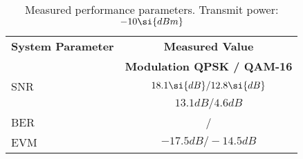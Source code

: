 \begin{table}[htbp]
  \centering
  \caption{Measured performance parameters. Transmit power: $\measPWR \si{dBm}$}
    \begin{tabular}{lc}
    \rowcolor[rgb]{ 0,  0,  0} \textcolor[rgb]{ 1,  1,  1}{\textbf{System Parameter}}	& \textcolor[rgb]{ 1,  1,  1}{\textbf{Measured Value}} 		\\
    \rowcolor[rgb]{ 0,  0,  0} \textcolor[rgb]{ 1,  1,  1}{} & \textcolor[rgb]{ 1,  1,  1}{\textbf{Modulation QPSK / QAM-16}}					\\
    	SNR 													& $\measSNRQPSKGood\si{dB} / \measSNRQAMGood\si{dB}$							\\
	\ebnot 													& $13.1\si{dB} / 4.6\si{dB}$							\\
    	BER			 											& \measBERQPSKGood / \measBERQAMGood 		\\
	EVM 													& $-17.5\si{dB} / -14.5\si{dB}$							\\

 \end{tabular}
  \label{tab:meas_params_good}
\end{table}